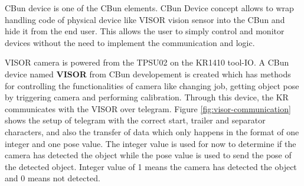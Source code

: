 CBun device is one of the CBun elements. CBun Device concept allows to wrap handling code of physical device like VISOR vision sensor into the CBun and hide it from the end user. This allows the user to simply control and monitor devices without the need to implement the communication and logic. \cite{cbun-device}

VISOR camera is powered from the TPSU02 on the KR1410 tool-IO.
A CBun device named \textbf{VISOR} from CBun developement is created which has methods for
controlling the functionalities of camera like changing job, getting object pose by triggering camera and performing calibration. Through this
device, the KR communicates with the VISOR over telegram. Figure \ref{fig:visor-communication} shows the setup of telegram with the correct start, trailer and separator characters, and also the transfer of data which only happens in the format of one integer and one pose value. The integer value is used for now to determine if the camera has detected the object while the pose value is used to send the pose of the detected object. Integer value of 1 means the camera has detected the object and 0 means not detected.


